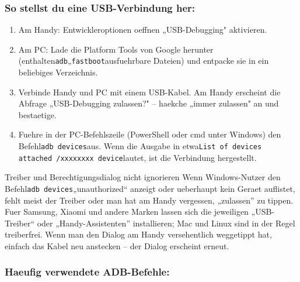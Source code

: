\subsubsection*{So stellst du eine USB-Verbindung her:}

\begin{enumerate}
  \item Am Handy: Entwickleroptionen oeffnen „USB-Debugging" aktivieren.
  \item Am PC: Lade die Platform Tools von Google herunter (enthalten\texttt{adb}„\texttt{fastboot}ausfuehrbare Dateien) und entpacke sie in ein beliebiges Verzeichnis.
  \item Verbinde Handy und PC mit einem USB-Kabel. Am Handy erscheint die Abfrage „USB-Debugging zulassen?" – haekche „immer zulassen" an und bestaetige.
  \item Fuehre in der PC-Befehlszeile (PowerShell oder cmd unter Windows) den Befehl\texttt{adb devices}aus. Wenn die Ausgabe in etwa\texttt{List of devices attached /\allowbreak  xxxxxxxx device}lautet, ist die Verbindung hergestellt.
\end{enumerate}

\begin{tcbwarn}{Treiber und Berechtigungsdialog nicht ignorieren}
Wenn Windows-Nutzer den Befehl\texttt{adb devices}„unauthorized“ anzeigt oder ueberhaupt kein Geraet auflistet, fehlt meist der Treiber oder man hat am Handy vergessen, „zulassen” zu tippen. Fuer Samsung, Xiaomi und andere Marken lassen sich die jeweiligen „USB-Treiber“ oder „Handy-Assistenten” installieren; Mac und Linux sind in der Regel treiberfrei. Wenn man den Dialog am Handy versehentlich weggetippt hat, einfach das Kabel neu anstecken – der Dialog erscheint erneut.

\end{tcbwarn}

\subsubsection*{Haeufig verwendete ADB-Befehle:}

